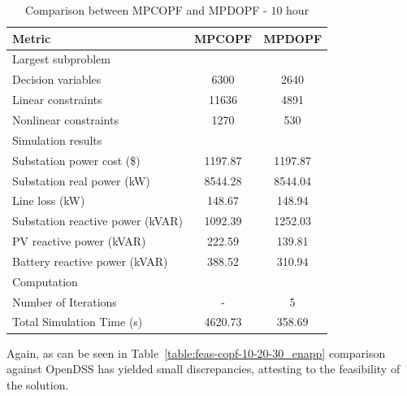 \begin{table}[H]
    \centering
    \caption{Comparison between MPCOPF and MPDOPF - $10$ hour}
    \begin{tabular}{|l|c|c|}
    \hline
    \textbf{Metric} & \textbf{MPCOPF} & \textbf{MPDOPF} \\ \hline
    Largest subproblem & \multicolumn{2}{c|}{} \\ \hline
    \quad Decision variables & {6300} & {2640} \\ \hline
    \quad Linear constraints & {11636} & {4891} \\ \hline
    \quad Nonlinear constraints & {1270} & {530} \\ \hline
    Simulation results  & \multicolumn{2}{c|}{} \\ \hline
    \quad Substation power cost (\$) & 1197.87 & 1197.87 \\ \hline
    \quad Substation real power (kW) & 8544.28 & 8544.04 \\ \hline
    \quad Line loss (kW) & 148.67 & 148.94 \\ \hline
    \quad Substation reactive power (kVAR) & 1092.39 & 1252.03 \\ \hline
    \quad PV reactive power (kVAR) & 222.59 & 139.81 \\ \hline
    \quad Battery reactive power (kVAR) & 388.52 & 310.94 \\ \hline
    Computation  & \multicolumn{2}{c|}{} \\ \hline
    \quad Number of Iterations & - & 5 \\ \hline
    \quad Total Simulation Time (s) & 4620.73 & 358.69 \\ \hline
    \end{tabular}
    \label{table:opt-10-20-30_enapp}
\end{table}

Again, as can be seen in Table~\ref{table:feas-copf-10-20-30_enapp} comparison against OpenDSS has yielded small discrepancies, attesting to the feasibility of the solution. 

